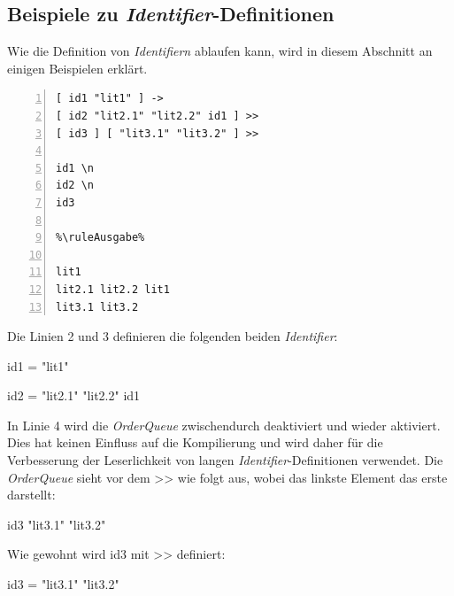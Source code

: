 \subsection{Beispiele zu \textit{Identifier}-Definitionen} \label{sec:howto-identifiers}
Wie die Definition von \textit{Identifiern} ablaufen kann, wird in diesem Abschnitt an einigen Beispielen erklärt.

\begin{minipage}{\linewidth}
\begin{multicols}{2}
\begin{lstlisting}[language=QHS, label=eg:howto_id1-3, caption=Beispiel zu gewöhnlichen \textit{Identifier}-Definitionen, numbers=left, stepnumber=1]
%\ruleEingabe%
[ id1 "lit1" ] ->
[ id2 "lit2.1" "lit2.2" id1 ] >>
[ id3 ] [ "lit3.1" "lit3.2" ] >>

id1 \n
id2 \n
id3

%\ruleAusgabe%

lit1
lit2.1 lit2.2 lit1
lit3.1 lit3.2
\end{lstlisting}
\columnbreak

Die Linien 2 und 3 definieren die folgenden beiden \textit{Identifier}: \break
\centerline{\selectListingFont id1 = "lit1"{}}
\centerline{\selectListingFont id2 = "lit2.1"{} "lit2.2"{} id1}
In Linie 4 wird die \textit{OrderQueue} zwischendurch deaktiviert und wieder aktiviert.
Dies hat keinen Einfluss auf die Kompilierung und wird daher für die Verbesserung der Leserlichkeit von langen \textit{Identifier}-Definitionen verwendet.
Die \textit{OrderQueue} sieht vor dem {\selectListingFont >>} wie folgt aus, wobei das linkste Element das erste darstellt:  \break
\centerline{\selectListingFont id3 "lit3.1"{} "lit3.2"{}}
Wie gewohnt wird {\selectListingFont id3} mit {\selectListingFont >>} definiert: \break
\centerline{\selectListingFont id3 = "lit3.1"{} "lit3.2"{}}
\end{multicols}
\end{minipage}
\vspace{\baselineskip}

